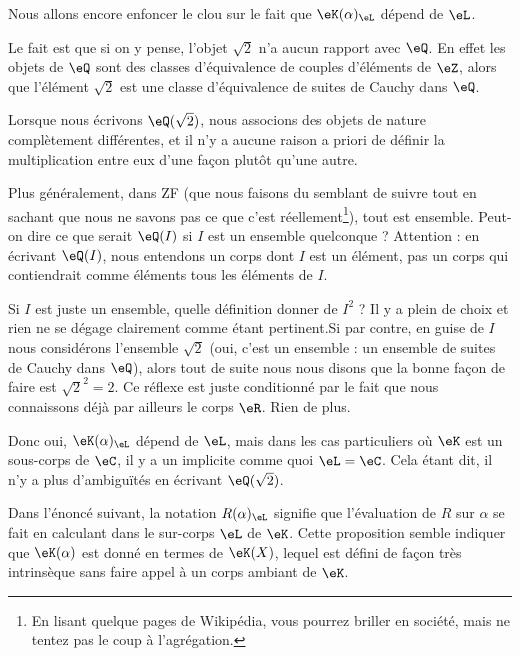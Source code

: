 \begin{normaltext}
    Nous allons encore enfoncer le clou sur le fait que \( \eK(\alpha)_{\eL}\) dépend de \( \eL\).

    Le fait est que si on y pense, l'objet \( \sqrt{ 2 }\) n'a aucun rapport avec \( \eQ\). En effet les objets de \( \eQ\) sont des classes d'équivalence de couples d'éléments de \( \eZ\), alors que l'élément \( \sqrt{ 2 }\) est une classe d'équivalence de suites de Cauchy dans \( \eQ\).

    Lorsque nous écrivons \( \eQ(\sqrt{ 2 })\), nous associons des objets de nature complètement différentes, et il n'y a aucune raison a priori de définir la multiplication entre eux d'une façon plutôt qu'une autre.

    Plus généralement, dans ZF (que nous faisons du semblant de suivre tout en sachant que nous ne savons pas ce que c'est réellement\footnote{En lisant quelque pages de Wikipédia, vous pourrez briller en société, mais ne tentez pas le coup à l'agrégation.}), tout est ensemble. Peut-on dire ce que serait \( \eQ(I)\) si \( I\) est un ensemble quelconque ? Attention : en écrivant \( \eQ(I)\), nous entendons un corps dont \( I\) est un élément, pas un corps qui contiendrait comme éléments tous les éléments de \( I\).

    Si \( I\) est juste un ensemble, quelle définition donner de \( I^2\) ? Il y a plein de choix et rien ne se dégage clairement comme étant pertinent.Si par contre, en guise de \( I\) nous considérons l'ensemble \( \sqrt{ 2 }\) (oui, c'est un ensemble : un ensemble de suites de Cauchy dans \( \eQ\)), alors tout de suite nous nous disons que la bonne façon de faire est \( \sqrt{ 2 }^2=2\). Ce réflexe est juste conditionné par le fait que nous connaissons déjà par ailleurs le corps \( \eR\). Rien de plus.

    Donc oui, \( \eK(\alpha)_{\eL}\) dépend de \( \eL\), mais dans les cas particuliers où \( \eK\) est un sous-corps de \( \eC\), il y a un implicite comme quoi \( \eL=\eC\). Cela étant dit, il n'y a plus d'ambiguïtés en écrivant \( \eQ(\sqrt{ 2 })\).
\end{normaltext}

Dans l'énoncé suivant, la notation \( R(\alpha)_{\eL}\) signifie que l'évaluation de \( R\) sur \( \alpha\) se fait en calculant dans le sur-corps \( \eL\) de \( \eK\).  Cette proposition semble indiquer que \( \eK(\alpha)\) est donné en termes de \( \eK(X)\), lequel est défini de façon très intrinsèque sans faire appel à un corps ambiant de \( \eK\).

